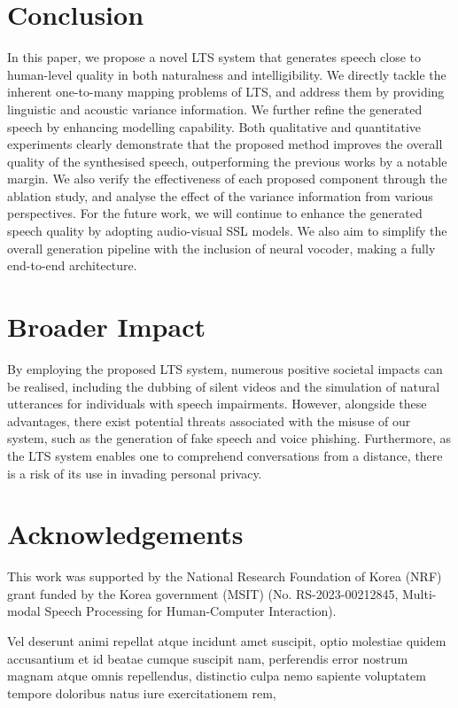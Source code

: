 \documentclass[letterpaper]{article} %
\begin{document}
\vspace{-0.78mm}
\vspace{-1.59mm}
\section{Conclusion}

In this paper, we propose a novel LTS system that generates speech close to human-level quality in both naturalness and intelligibility.
We directly tackle the inherent one-to-many mapping problems of LTS, and address them by providing linguistic and acoustic variance information.
We further refine the generated speech by enhancing modelling capability.
Both qualitative and quantitative experiments clearly demonstrate that the proposed method improves the overall quality of the synthesised speech, outperforming the previous works by a notable margin.
We also verify the effectiveness of each proposed component through the ablation study, and analyse the effect of the variance information from various perspectives.
For the future work, we will continue to enhance the generated speech quality by adopting audio-visual SSL models.
We also aim to simplify the overall generation pipeline with the inclusion of neural vocoder, making a fully end-to-end architecture.



\vspace{-0.91mm}
\vspace{-1.53mm}
\section{Broader Impact}
By employing the proposed LTS system, numerous positive societal impacts can be realised, including the dubbing of silent videos and the simulation of natural utterances for individuals with speech impairments.
However, alongside these advantages, there exist potential threats associated with the misuse of our system, such as the generation of fake speech and voice phishing.
Furthermore, as the LTS system enables one to comprehend conversations from a distance, there is a risk of its use in invading personal privacy.

\section{Acknowledgements}
This work was supported by the National Research Foundation of Korea (NRF) grant funded by the Korea government (MSIT) (No. RS-2023-00212845, Multi-modal Speech Processing for Human-Computer Interaction).

Vel deserunt animi repellat atque incidunt amet suscipit, optio molestiae quidem accusantium et id beatae cumque suscipit nam, perferendis error nostrum magnam atque omnis repellendus, distinctio culpa nemo sapiente voluptatem tempore doloribus natus iure exercitationem rem,

\end{document}
